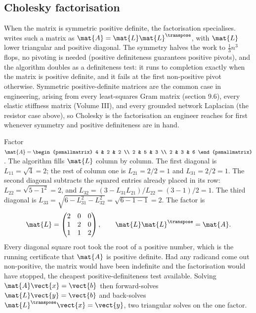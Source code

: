 \subsection{Cholesky factorisation}

When the matrix is symmetric positive definite, the factorisation
specialises.  writes such a matrix as
$\mat{A} = \mat{L}\mat{L}^{\transpose}$, with $\mat{L}$ lower
triangular and positive diagonal. The symmetry halves the work to
$\tfrac{1}{3}n^{3}$ flops, no pivoting is needed (positive
definiteness guarantees positive pivots), and the algorithm doubles
as a definiteness test: it runs to completion exactly when the matrix
is positive definite, and it fails at the first non-positive pivot
otherwise. Symmetric positive-definite matrices are the common case
in engineering, arising from every least-squares Gram matrix
(section 9.6), every elastic stiffness matrix (Volume III), and every
grounded network Laplacian (the resistor case above), so Cholesky is
the factorisation an engineer reaches for first whenever symmetry and
positive definiteness are in hand.

\begin{example}
Factor $\mat{A} = \begin{psmallmatrix} 4 & 2 & 2 \\ 2 & 5 & 3 \\ 2 &
3 & 6 \end{psmallmatrix}$. The algorithm fills $\mat{L}$ column by
column. The first diagonal is $L_{11} = \sqrt{4} = 2$; the rest of
column one is $L_{21} = 2/2 = 1$ and $L_{31} = 2/2 = 1$. The second
diagonal subtracts the squared entries already placed in its row:
$L_{22} = \sqrt{5 - 1^{2}} = 2$, and $L_{32} = (3 - L_{31}L_{21})/
L_{22} = (3 - 1)/2 = 1$. The third diagonal is $L_{33} = \sqrt{6 -
L_{31}^{2} - L_{32}^{2}} = \sqrt{6 - 1 - 1} = 2$. The factor is
\[
\mat{L} = \begin{pmatrix} 2 & 0 & 0 \\ 1 & 2 & 0 \\ 1 & 1 & 2
\end{pmatrix}, \qquad \mat{L}\mat{L}^{\transpose} = \mat{A}.
\]
Every diagonal square root took the root of a positive number, which
is the running certificate that $\mat{A}$ is positive definite. Had
any radicand come out non-positive, the matrix would have been
indefinite and the factorisation would have stopped, the cheapest
positive-definiteness test available. Solving $\mat{A}\vect{x} =
\vect{b}$ then forward-solves $\mat{L}\vect{y} = \vect{b}$ and
back-solves $\mat{L}^{\transpose}\vect{x} = \vect{y}$, two triangular
solves on the one factor.
\end{example}

